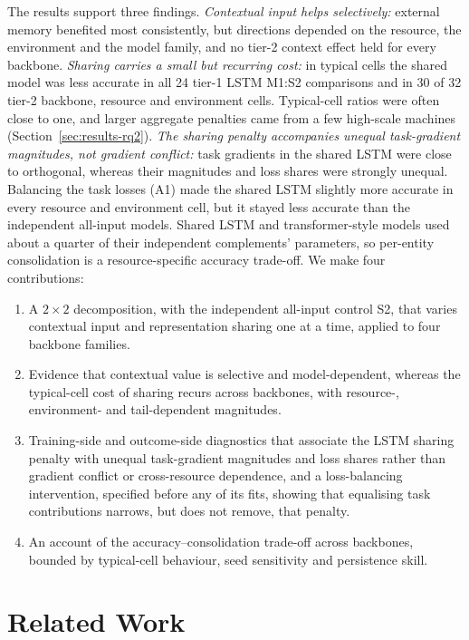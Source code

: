\documentclass[5p,twocolumn]{elsarticle}
\begin{document}
The results support three findings. \emph{Contextual input helps
selectively:} external memory benefited most consistently, but directions
depended on the resource, the environment and the model family, and no
tier-2 context effect held for every backbone. \emph{Sharing carries a small
but recurring cost:} in typical cells the shared model was less accurate in
all 24 tier-1 LSTM M1:S2 comparisons and in 30 of 32 tier-2 backbone,
resource and environment cells. Typical-cell ratios were often close to one,
and larger aggregate penalties came from a few high-scale machines
(Section~\ref{sec:results-rq2}). \emph{The sharing penalty accompanies
unequal task-gradient magnitudes, not gradient conflict:} task gradients in
the shared LSTM were close to orthogonal, whereas their magnitudes and loss
shares were strongly unequal. Balancing the task losses (A1) made the shared
LSTM slightly more accurate in every resource and environment cell, but it
stayed less accurate than the independent all-input models. Shared LSTM and transformer-style models used
about a quarter of their independent complements' parameters, so per-entity
consolidation is a resource-specific accuracy trade-off. We make four
contributions:

\begin{enumerate}
  \item A $2\times2$ decomposition, with the independent all-input control
    S2, that varies contextual input and representation sharing one at a
    time, applied to four backbone families.
  \item Evidence that contextual value is selective and model-dependent,
    whereas the typical-cell cost of sharing recurs across backbones, with
    resource-, environment- and tail-dependent magnitudes.
  \item Training-side and outcome-side diagnostics that associate the LSTM
    sharing penalty with unequal task-gradient magnitudes and loss shares
    rather than gradient conflict or cross-resource dependence, and a
    loss-balancing intervention, specified before any of its fits, showing
    that equalising task
    contributions narrows, but does not remove, that penalty.
  \item An account of the accuracy--consolidation trade-off across
    backbones, bounded by typical-cell behaviour, seed sensitivity and
    persistence skill.
\end{enumerate}

\section{Related Work}
\label{sec:related-work}
\end{document}
